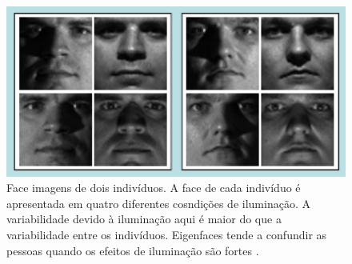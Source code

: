 	\begin{figure}[hbt]
		\begin{center}
			\includegraphics[width=14cm]{figuras/2.FundamentacaoTeorica/exemplosImagensIluminacaoo.png}
		\end{center}
		\caption{Face imagens de dois indivíduos. A face de cada indivíduo é apresentada em quatro diferentes cosndições de iluminação. A variabilidade devido à iluminação aqui é maior do que a variabilidade entre os indivíduos. Eigenfaces tende a confundir as pessoas quando os efeitos de iluminação são fortes \cite{hewitt}.}
		\label{exemplosImagensIluminacaoo}
	\end{figure}




